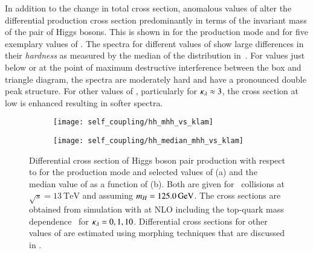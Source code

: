 In addition to the change in total cross section, anomalous values of \klambda
alter the differential \HH production cross section predominantly in terms of
the invariant mass of the pair of Higgs bosons. This is shown in
 for the \ggF production mode and for five exemplary
values of \klambda. The \mHH spectra for different values of \klambda show large
differences in their \emph{hardness} as measured by the median of the \mHH
distribution in~. For \klambda values just below or at
the point of maximum destructive interference between the box and triangle
diagram, the \mHH spectra are moderately hard and have a pronounced double peak
structure. For other values of \klambda, particularly for $\kappa_{\lambda} \approx 3$,
the cross section at low \mHH is enhanced resulting in softer \mHH spectra.

\begin{figure}[htbp]
  \begin{subfigure}[t]{0.485\textwidth}
    \texttt{[image: self\_coupling/hh\_mhh\_vs\_klam]}
    \subcaption{%
    }%
    \label{fig:hh_xsec_mhh}
  \end{subfigure}\hfill%
  \begin{subfigure}[t]{0.485\textwidth}
    \texttt{[image: self\_coupling/hh\_median\_mhh\_vs\_klam]}
    \subcaption{%
    }%
    \label{fig:hh_median_mhh}
  \end{subfigure}

  \caption[Differential cross section of Higgs boson pair production with
  respect to \mHH for the \ggF production mode and selected values of \klambda
  and the median value of \mHH as a function of \klambda.]{Differential cross
    section of Higgs boson pair production with respect to \mHH for the \ggF
    production mode and selected values of \klambda (a) and the median value of
    \mHH as a function of \klambda (b). Both are given for \pp~collisions at
    $\sqrt{s} = \SI{13}{\TeV}$ and assuming $m_{H} = \SI{125.0}{\ensuremath{\text{GeV}}}$. The cross
    sections are obtained from simulation with \POWHEGBOX[v2] at NLO including
    the top-quark mass dependence~\cite{Heinrich:2019bkc,Heinrich:2020ckp} for
    $\kappa_{\lambda} = 0, 1, 10$. Differential cross sections for other values of
    \klambda are estimated using morphing techniques that are discussed in
    .}
  \label{fig:xsec_median_mhh}
\end{figure}

